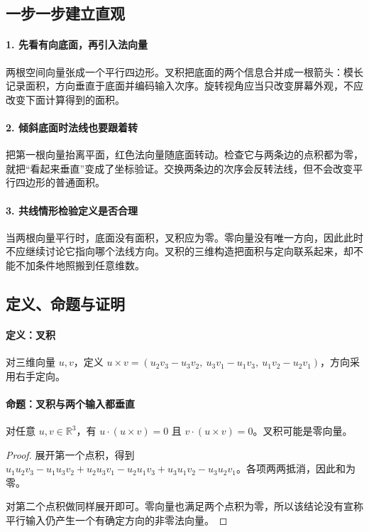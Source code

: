 \subsection*{一步一步建立直观}

\paragraph{1. 先看有向底面，再引入法向量}

两根空间向量张成一个平行四边形。叉积把底面的两个信息合并成一根箭头：模长记录面积，方向垂直于底面并编码输入次序。旋转视角应当只改变屏幕外观，不应改变下面计算得到的面积。



\paragraph{2. 倾斜底面时法线也要跟着转}

把第一根向量抬离平面，红色法向量随底面转动。检查它与两条边的点积都为零，就把“看起来垂直”变成了坐标验证。交换两条边的次序会反转法线，但不会改变平行四边形的普通面积。



\paragraph{3. 共线情形检验定义是否合理}

当两根向量平行时，底面没有面积，叉积应为零。零向量没有唯一方向，因此此时不应继续讨论它指向哪个法线方向。叉积的三维构造把面积与定向联系起来，却不能不加条件地照搬到任意维数。



\subsection*{定义、命题与证明}

\paragraph{定义：叉积}

对三维向量 $u,v$，定义 $u\times v=(u_2v_3-u_3v_2,\ u_3v_1-u_1v_3,\ u_1v_2-u_2v_1)$，方向采用右手定向。

\paragraph{命题：叉积与两个输入都垂直}

对任意 $u,v\in\mathbb R^3$，有 $u\cdot(u\times v)=0$ 且 $v\cdot(u\times v)=0$。叉积可能是零向量。

\begin{proof}

展开第一个点积，得到 $u_1u_2v_3-u_1u_3v_2+u_2u_3v_1-u_2u_1v_3+u_3u_1v_2-u_3u_2v_1$。各项两两抵消，因此和为零。

对第二个点积做同样展开即可。零向量也满足两个点积为零，所以该结论没有宣称平行输入仍产生一个有确定方向的非零法向量。

\end{proof}
